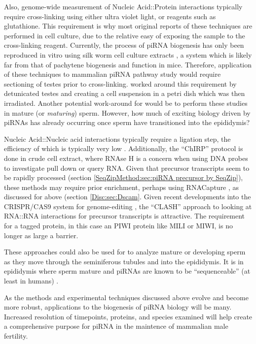       Also, genome-wide measurement of Nucleic Acid::Protein interactions typically require cross-linking \citep{Chodosh2001} using either ultra violet light, or reagents such as glutathione. This requirement is why most original reports of these techniques are performed in cell culture, due to the relative easy of exposing the sample to the cross-linking reagent. Currently, the process of piRNA biogenesis has only been reproduced in vitro using silk worm cell culture extracts \citep{Kawaoka2009,Kawaoka2011}, a system which is likely far from that of pachytene biogenesis and function in mice. Therefore, application of these techniques to mammalian piRNA pathway study would require sectioning of testes prior to cross-linking. \citep{Vourekas2012} worked around this requirement by detunicated testes and creating a cell suspension in a petri dish which was then irradiated. Another potential work-around for would be to perform these studies in mature (or \textit{maturing}) sperm. However, how much of exciting biology driven by piRNAs has already occurring once sperm have transitioned into the epididymis?

      Nucleic Acid::Nucleic acid interactions typically require a ligation step, the efficiency of which is typically very low \citep{Helwak2014}. Additionally, the ``ChIRP'' protocol is done in crude cell extract, where RNAse H is a concern when using DNA probes to investigate pull down or query RNA. Given that precursor transcripts seem to be rapidly processed (section \ref{SeqZipMethod:sec:piRNA precursor by SeqZip}), these methods may require prior enrichment, perhaps using RNACapture \citep{Mercer2014}, as discussed for \dscam{} above (section \ref{Disc:sec:Dscam}. Given recent developments into the CRISPR/CAS9 system for genome-editing \citep{Sander2014}, the ``CLASH'' approach to looking at RNA::RNA interactions for precursor transcripts is attractive. The requirement for a tagged protein, in this case an PIWI protein like MILI or MIWI, is no longer as large a barrier.

      These approaches could also be used for to analyze mature or developing sperm as they move through the seminiferous tubules and into the epididymis. It is in epididymis where sperm mature and piRNAs are known to be ``sequenceable'' (at least in humans) \citep{Jones1999,Li2012a}.

      As the methods and experimental techniques discussed above evolve and become more robust, applications to the biogenesis of piRNA biology will be many. Increased resolution of timepoints, proteins, and species examined will help create a comprehensive purpose for piRNA in the maintence of mammalian male fertility.

